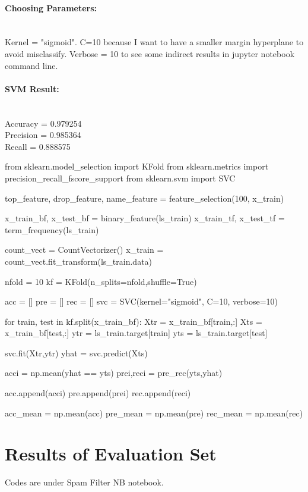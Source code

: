 \documentclass{article}
\begin{document}
\paragraph{Choosing Parameters:} \mbox{}\\ Kernel = "sigmoid". C=10 because I want to have a smaller margin hyperplane to avoid misclassify. Verbose = 10 to see some indirect results in jupyter notebook command line.

\paragraph{SVM Result:}\mbox{}\\
Accuracy  = 0.979254
\\ Precision = 0.985364
\\ Recall    = 0.888575

\begin{python} 
from sklearn.model_selection import KFold
from sklearn.metrics import precision_recall_fscore_support
from sklearn.svm import SVC

top_feature, drop_feature, name_feature = feature_selection(100, x_train)

x_train_bf, x_test_bf = binary_feature(ls_train)
x_train_tf, x_test_tf = term_frequency(ls_train)

count_vect = CountVectorizer()
x_train = count_vect.fit_transform(ls_train.data)

nfold = 10
kf = KFold(n_splits=nfold,shuffle=True)

acc = []
pre = []
rec = []
svc = SVC(kernel="sigmoid", C=10, verbose=10)

for train, test in kf.split(x_train_bf):
    Xtr = x_train_bf[train,:]
    Xts = x_train_bf[test,:]
    ytr = ls_train.target[train]
    yts = ls_train.target[test]
    
    svc.fit(Xtr,ytr)
    yhat = svc.predict(Xts)
    
    acci = np.mean(yhat == yts)
    prei,reci = pre_rec(yts,yhat)
    
    acc.append(acci)
    pre.append(prei)
    rec.append(reci)

acc_mean = np.mean(acc)
pre_mean = np.mean(pre)
rec_mean = np.mean(rec)
\end{python}

\section{Results of Evaluation Set} Codes are under Spam Filter NB notebook.
\end{document}
